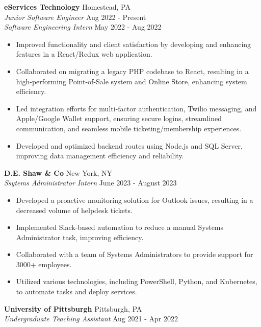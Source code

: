 \documentclass[letterpaper]{article}
\begin{document}
\textbf{eServices Technology} \hfill Homestead, PA\\
\textit{Junior Software Engineer} \hfill Aug 2022 - Present\\
\textit{Software Engineering Intern} \hfill May 2022 - Aug 2022\\
\vspace{-1mm}
\begin{itemize} \itemsep -1pt
	\item Improved functionality and client satisfaction by developing and enhancing features in a React/Redux web application.
    \item Collaborated on migrating a legacy PHP codebase to React, resulting in a high-performing Point-of-Sale system and Online Store, enhancing system efficiency.
    \item Led integration efforts for multi-factor authentication, Twilio messaging, and Apple/Google Wallet support, ensuring secure logins, streamlined communication, and seamless mobile ticketing/membership experiences.
    \item Developed and optimized backend routes using Node.js and SQL Server, improving data management efficiency and reliability.
\end{itemize}
\vspace{-1mm}
\textbf{D.E. Shaw \& Co} \hfill New York, NY\\
\textit{Ssytems Administrator Intern} \hfill June 2023 - August 2023\\
\vspace{-1mm}
\begin{itemize} \itemsep -1pt
	\item Developed a proactive monitoring solution for Outlook issues, resulting in a decreased volume of helpdesk tickets.
	\item Implemented Slack-based automation to reduce a manual Systems Administrator task, improving efficiency.
	\item Collaborated with a team of Systems Administrators to provide support for 3000+ employees.
	\item Utilized various technologies, including PowerShell, Python, and Kubernetes, to automate tasks and deploy services.
\end{itemize}
\vspace{-1mm}
\textbf{University of Pittsburgh} \hfill Pittsburgh, PA\\
\textit{Undergraduate Teaching Assistant} \hfill Aug 2021 - Apr 2022\\
\vspace{-1mm}
\end{document}

